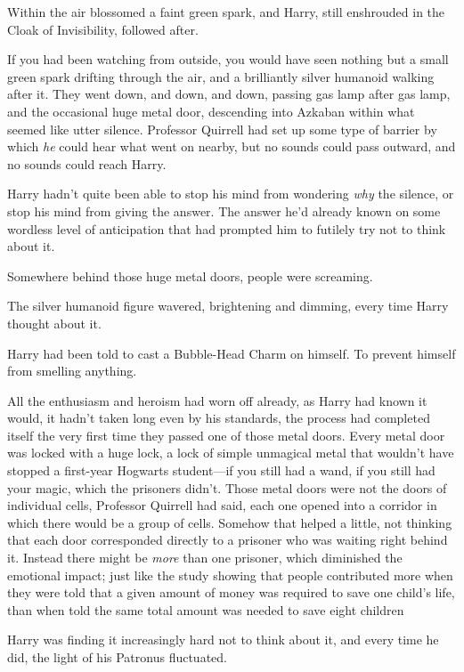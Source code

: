 Within the air blossomed a faint green spark, and Harry, still enshrouded in
the Cloak of Invisibility, followed after.

If you had been watching from outside, you would have seen nothing but a small
green spark drifting through the air, and a brilliantly silver humanoid walking
after it.
\sbreak
They went down, and down, and down, passing gas lamp after gas lamp, and the
occasional huge metal door, descending into Azkaban within what seemed like
utter silence. Professor Quirrell had set up some type of barrier by which
\emph{he} could hear what went on nearby, but no sounds could pass outward, and
no sounds could reach Harry.

Harry hadn't quite been able to stop his mind from wondering \emph{why} the
silence, or stop his mind from giving the answer. The answer he'd already known
on some wordless level of anticipation that had prompted him to futilely try
not to think about it.

Somewhere behind those huge metal doors, people were screaming.

The silver humanoid figure wavered, brightening and dimming, every time Harry
thought about it.

Harry had been told to cast a Bubble-Head Charm on himself. To prevent himself
from smelling anything.

All the enthusiasm and heroism had worn off already, as Harry had known it
would, it hadn't taken long even by his standards, the process had completed
itself the very first time they passed one of those metal doors. Every metal
door was locked with a huge lock, a lock of simple unmagical metal that
wouldn't have stopped a first-year Hogwarts student—if you still had a wand,
if you still had your magic, which the prisoners didn't. Those metal doors were
not the doors of individual cells, Professor Quirrell had said, each one opened
into a corridor in which there would be a group of cells. Somehow that helped a
little, not thinking that each door corresponded directly to a prisoner who was
waiting right behind it. Instead there might be \emph{more} than one prisoner,
which diminished the emotional impact; just like the study showing that people
contributed more when they were told that a given amount of money was required
to save one child's life, than when told the same total amount was needed to
save eight children{\el}

Harry was finding it increasingly hard not to think about it, and every time he
did, the light of his Patronus fluctuated.

